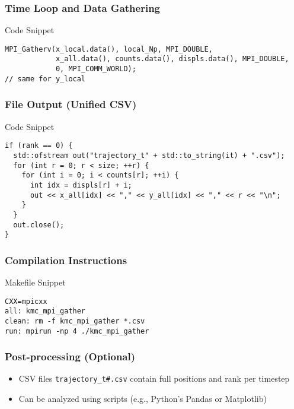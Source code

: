 \documentclass[10pt]{beamer}
\begin{document}
\begin{frame}[fragile]
\frametitle{Time Loop and Data Gathering}
\begin{block}{Code Snippet}
\begin{minipage}{\linewidth}
\begin{verbatim}
MPI_Gatherv(x_local.data(), local_Np, MPI_DOUBLE,
            x_all.data(), counts.data(), displs.data(), MPI_DOUBLE,
            0, MPI_COMM_WORLD);
// same for y_local
\end{verbatim}
\end{minipage}
\end{block}
\end{frame}

\begin{frame}[fragile]
\frametitle{File Output (Unified CSV)}
\begin{block}{Code Snippet}
\begin{minipage}{\\linewidth}
\begin{verbatim}
if (rank == 0) {
  std::ofstream out("trajectory_t" + std::to_string(it) + ".csv");
  for (int r = 0; r < size; ++r) {
    for (int i = 0; i < counts[r]; ++i) {
      int idx = displs[r] + i;
      out << x_all[idx] << "," << y_all[idx] << "," << r << "\n";
    }
  }
  out.close();
}
\end{verbatim}
\end{minipage}
\end{block}
\end{frame}

\begin{frame}[fragile]
\frametitle{Compilation Instructions}
\begin{block}{Makefile Snippet}
\begin{minipage}{\linewidth}
\begin{verbatim}
CXX=mpicxx
all: kmc_mpi_gather
clean: rm -f kmc_mpi_gather *.csv
run: mpirun -np 4 ./kmc_mpi_gather
\end{verbatim}
\end{minipage}
\end{block}
\end{frame}

\begin{frame}[fragile]
\frametitle{Post-processing (Optional)}
\begin{itemize}
  \item CSV files \texttt{trajectory\_t\#.csv} contain full positions and rank per timestep
  \item Can be analyzed using scripts (e.g., Python's Pandas or Matplotlib)
\end{itemize}
\end{frame}
\end{document}
